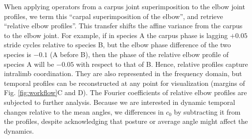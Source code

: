 When applying operators from a carpus joint superimposition to the elbow joint profiles, we term this ``carpal superimposition of the elbow'', and retrieve ``relative elbow profiles''.
This transfer shifts the affine variance from the carpus to the elbow joint.
For example, if in species A the carpus phase is lagging $+0.05$ stride cycles relative to species B, but the elbow phase difference of the two species is $-0.1$ (A before B), then the phase of the relative elbow profile of species A will be $-0.05$ with respect to that of B.
Hence, relative profiles capture intralimb coordination.
They are also represented in the frequency domain, but temporal profiles can be reconstructed at any point for visualization  (margins of Fig. \ref{fig:workflow}C and D).
The Fourier coefficients of relative elbow profiles are subjected to further analysis.
Because we are interested in dynamic temporal changes relative to the mean  angles, we  differences in $c_0$ by subtracting it from the profiles, despite acknowledging that posture or average  angle might affect the dynamics.

